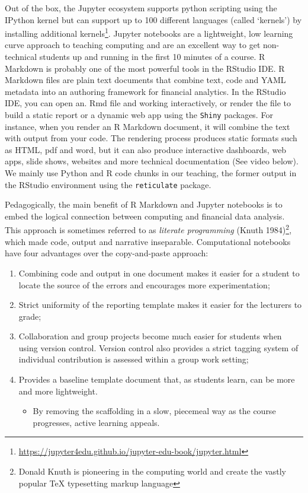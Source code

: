 \documentclass{article}
\begin{document}
Out of the box, the Jupyter ecosystem supports python scripting using
the IPython kernel but can support up to 100 different languages (called
`kernels') by installing additional kernels\footnote{\url{https://jupyter4edu.github.io/jupyter-edu-book/jupyter.html}}.
Jupyter notebooks are a lightweight, low learning curve approach to
teaching computing and are an excellent way to get non-technical
students up and running in the first 10 minutes of a course. R Markdown
is probably one of the most powerful tools in the RStudio IDE. R
Markdown files are plain text documents that combine text, code and YAML
metadata into an authoring framework for financial analytics. In the
RStudio IDE, you can open an. Rmd file and working interactively, or
render the file to build a static report or a dynamic web app using the
\texttt{Shiny} packages. For instance, when you render an R Markdown
document, it will combine the text with output from your code. The
rendering process produces static formats such as HTML, pdf and word,
but it can also produce interactive dashboards, web apps, slide shows,
websites and more technical documentation (See video below). We mainly
use Python and R code chunks in our teaching, the former output in the
RStudio environment using the \texttt{reticulate} package.

Pedagogically, the main benefit of R Markdown and Jupyter notebooks is
to embed the logical connection between computing and financial data
analysis. This approach is sometimes referred to as \emph{literate
programming} (Knuth 1984)\footnote{Donald Knuth is pioneering in the
  computing world and create the vastly popular TeX typesetting markup
  language}, which made code, output and narrative inseparable.
Computational notebooks have four advantages over the copy-and-paste
approach:

\begin{enumerate}
\def\labelenumi{\arabic{enumi}.}
\tightlist
\item
  Combining code and output in one document makes it easier for a
  student to locate the source of the errors and encourages more
  experimentation;
\item
  Strict uniformity of the reporting template makes it easier for the
  lecturers to grade;
\item
  Collaboration and group projects become much easier for students when
  using version control. Version control also provides a strict tagging
  system of individual contribution is assessed within a group work
  setting;
\item
  Provides a baseline template document that, as students learn, can be
  more and more lightweight.

  \begin{itemize}
  \tightlist
  \item
    By removing the scaffolding in a slow, piecemeal way as the course
    progresses, active learning appeals.
  \end{itemize}
\end{enumerate}
\end{document}
